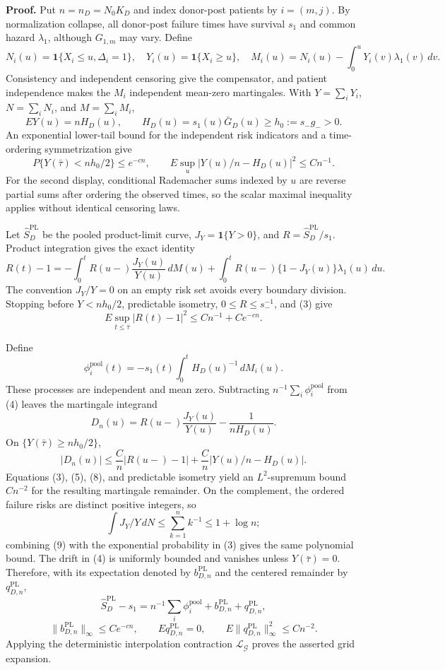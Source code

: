 \textbf{Proof.}
Put \(n=n_D=N_0K_D\) and index donor-post patients by \(i=(m,j)\). By normalization collapse, all donor-post failure times have survival \(s_1\) and common hazard \(\lambda_1\), although \(G_{1,m}\) may vary. Define
\[
 N_i(u)=\mathbf1\{X_i\le u,\Delta_i=1\},\quad
 Y_i(u)=\mathbf1\{X_i\ge u\},\quad
 M_i(u)=N_i(u)-\int_0^uY_i(v)\lambda_1(v)\,dv.            \tag{1}
\]
Consistency and independent censoring give the compensator, and patient independence makes the \(M_i\) independent mean-zero martingales. With \(Y=\sum_iY_i\), \(N=\sum_iN_i\), and \(M=\sum_iM_i\),
\[
 EY(u)=nH_D(u),\qquad H_D(u)=s_1(u)\bar G_D(u)\ge h_0:=s_-g_->0. \tag{2}
\]
An exponential lower-tail bound for the independent risk indicators and a time-ordering symmetrization give
\[
 P\{Y(\bar\tau)<nh_0/2\}\le e^{-cn},\qquad
 E\sup_u|Y(u)/n-H_D(u)|^2\le Cn^{-1}.                    \tag{3}
\]
For the second display, conditional Rademacher sums indexed by \(u\) are reverse partial sums after ordering the observed times, so the scalar maximal inequality applies without identical censoring laws.

Let \(\widehat S_D^{\mathrm{PL}}\) be the pooled product-limit curve, \(J_Y=\mathbf1\{Y>0\}\), and \(R=\widehat S_D^{\mathrm{PL}}/s_1\). Product integration gives the exact identity
\[
 R(t)-1=-\int_0^tR(u-)\frac{J_Y(u)}{Y(u)}\,dM(u)
 +\int_0^tR(u-)\{1-J_Y(u)\}\lambda_1(u)\,du.             \tag{4}
\]
The convention \(J_Y/Y=0\) on an empty risk set avoids every boundary division. Stopping before \(Y<nh_0/2\), predictable isometry, \(0\le R\le s_-^{-1}\), and (3) give
\[
 E\sup_{t\le\bar\tau}|R(t)-1|^2\le Cn^{-1}+Ce^{-cn}.     \tag{5}
\]

Define
\[
 \phi_i^{\mathrm{pool}}(t)=-s_1(t)\int_0^tH_D(u)^{-1}\,dM_i(u). \tag{6}
\]
These processes are independent and mean zero. Subtracting \(n^{-1}\sum_i\phi_i^{\mathrm{pool}}\) from (4) leaves the martingale integrand
\[
 D_n(u)=R(u-)\frac{J_Y(u)}{Y(u)}-\frac1{nH_D(u)}.          \tag{7}
\]
On \(\{Y(\bar\tau)\ge nh_0/2\}\),
\[
 |D_n(u)|\le \frac{C}{n}|R(u-)-1|
 +\frac{C}{n}|Y(u)/n-H_D(u)|.                             \tag{8}
\]
Equations (3), (5), (8), and predictable isometry yield an \(L^2\)-supremum bound \(Cn^{-2}\) for the resulting martingale remainder. On the complement, the ordered failure risks are distinct positive integers, so
\[
 \int J_Y/Y\,dN\le\sum_{k=1}^nk^{-1}\le1+\log n;         \tag{9}
\]
combining (9) with the exponential probability in (3) gives the same polynomial bound. The drift in (4) is uniformly bounded and vanishes unless \(Y(\bar\tau)=0\). Therefore, with its expectation denoted by \(b_{D,n}^{\mathrm{PL}}\) and the centered remainder by \(q_{D,n}^{\mathrm{PL}}\),
\[
 \widehat S_D^{\mathrm{PL}}-s_1
 =n^{-1}\sum_i\phi_i^{\mathrm{pool}}
 +b_{D,n}^{\mathrm{PL}}+q_{D,n}^{\mathrm{PL}},             \tag{10}
\]
\[
 \|b_{D,n}^{\mathrm{PL}}\|_\infty\le Ce^{-cn},\qquad
 Eq_{D,n}^{\mathrm{PL}}=0,\qquad
 E\|q_{D,n}^{\mathrm{PL}}\|_\infty^2\le Cn^{-2}.         \tag{11}
\]
Applying the deterministic interpolation contraction \(\mathcal L_{\mathcal G}\) proves the asserted grid expansion.


